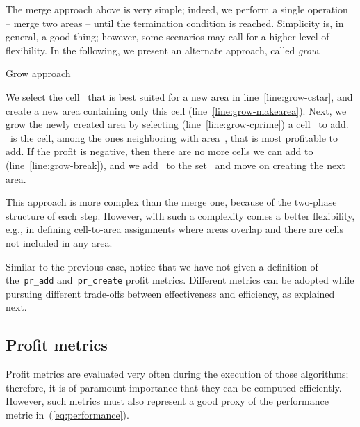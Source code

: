 \documentclass[10pt, conference, compsocconf]{IEEEtran}
\numberwithin{equation}{section}
\begin{document}
The merge approach above is very simple; indeed, we perform a single operation -- merge
two areas -- until the termination condition is reached.
Simplicity is, in general, a good thing; however, some scenarios may call for
a higher level of flexibility. In the following, we present an alternate approach,
called {\em grow}.



\begin{algorithm}
\begin{algorithmic}[1]
\Require{}
\State{}
 \State{}\label{line:grow-cstar}
\If{} \label{line:grow-stop}
\EndIf
\State{}\label{line:grow-makearea}
\While{}\label{line:grow-while}
\State{}\label{line:grow-cprime}
\label{line:grow-break}
\State{}\label{line:grow-add}
\EndWhile
\State{}
\EndWhile
\State\Return{}
\end{algorithmic}
\caption{\label{alg:grow}Grow approach}
\end{algorithm}
We select the cell~ that is best suited for a new area in line~\ref{line:grow-cstar},
and create a new area containing only this cell (line~\ref{line:grow-makearea}).
Next, we grow the newly created area by selecting (line~\ref{line:grow-cprime}) a cell~
to add. ~is the cell, among the ones neighboring with area~, that is most profitable
to add. If the profit is negative, then there are no more cells we can add to~
(line~\ref{line:grow-break}), and we add~ to the set~ and move on creating the next area.

This approach is more complex than the merge one, because of the two-phase
structure of each step. However, with such a complexity comes a better flexibility, e.g.,
in defining cell-to-area assignments where areas overlap and there are cells
not included in any area.

Similar to the previous case, notice that we have not given a definition of the~\texttt{pr\_add}
and~\texttt{pr\_create} profit metrics. Different metrics can be adopted while pursuing different
trade-offs between effectiveness and efficiency, as explained next.

\subsection{Profit metrics
\label{ssec:metrics}
}



Profit metrics are evaluated very often during the execution of those algorithms; therefore,
it is of paramount importance that they can be computed efficiently. However, such metrics
must also represent a good proxy of the performance metric in~(\ref{eq:performance}).
\end{document}
